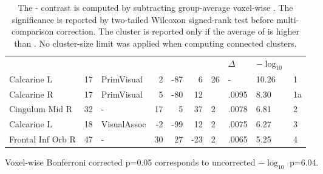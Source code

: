 \begin{table}
    \small
    \centering
    \begin{ThreePartTable}
    \begin{tabularx}{\textwidth}{l l p{1.6cm} *{3}{r} *{2}{P{1cm}} P{1.4cm} P{.5cm}}
        
     \\
    \toprule
     &  &  &  &  &  &  & \(\Delta\)  & \(-\log_{10}\) &  \\
    \toprule
Calcarine L & 17 & PrimVisual & 2 & -87 & 6 & 26 & - & 10.26 & 1 \\
Calcarine R & 17 & PrimVisual & 5 & -80 & 12 &   & .0095  & 8.30 & 1a \\
Cingulum Mid R & 32 & - & 17 & 5 & 37 & 2 & .0078 & 6.81  & 2 \\
Calcarine L & 18 & VisualAssoc & -2 & -99 & 12 & 2 & .0075& 6.27  & 3 \\
\midrule
Frontal Inf Orb R & 47 & - & 30 & 27 & -23 & 2 & .0065  & 5.25  & 4 \\
\bottomrule
    \end{tabularx}
    \begin{tablenotes}
        \footnotesize
        \item Voxel-wise Bonferroni corrected p=0.05 corresponds to uncorrected \(-\log_{10}\) p=6.04.
    \end{tablenotes}  
\end{ThreePartTable}
\caption[ Voxel Contrast, , Group]{The - contrast is computed by subtracting group-average voxel-wise . The significance is reported by two-tailed Wilcoxon signed-rank test before multi-comparison correction. The cluster is reported only if the average  of  is higher than . No cluster-size limit was applied when computing connected clusters. \label{tab:sigasnContrastClusters_asn}}
\end{table}

